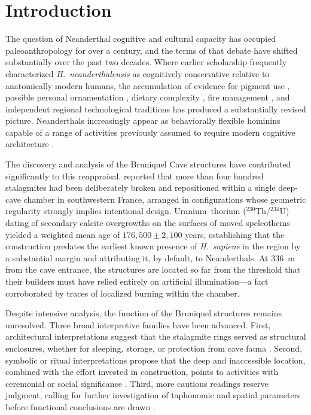 \documentclass[12pt]{article}
\begin{document}
\tableofcontents
\newpage

\section{Introduction}

The question of Neanderthal cognitive and cultural capacity has occupied paleoanthropology for over a century, and the terms of that debate have shifted substantially over the past two decades. Where earlier scholarship frequently characterized \textit{H.\ neanderthalensis} as cognitively conservative relative to anatomically modern humans, the accumulation of evidence for pigment use \citep{Zilhao2010, Roebroeks2012}, possible personal ornamentation \citep{Peresani2011, Radovčić2015, Morin2012}, dietary complexity \citep{Hardy2013}, fire management \citep{Sandgathe2011}, and independent regional technological traditions \citep{Wil2019} has produced a substantially revised picture. Neanderthals increasingly appear as behaviorally flexible hominins capable of a range of activities previously assumed to require modern cognitive architecture \citep{Stringer2012, Wil2019}.

The discovery and analysis of the Bruniquel Cave structures have contributed significantly to this reappraisal. \citet{Jaubert2016} reported that more than four hundred stalagmites had been deliberately broken and repositioned within a single deep-cave chamber in southwestern France, arranged in configurations whose geometric regularity strongly implies intentional design. Uranium--thorium ($^{230}$Th/$^{234}$U) dating of secondary calcite overgrowths on the surfaces of moved speleothems yielded a weighted mean age of $176{,}500 \pm 2{,}100$ years, establishing that the construction predates the earliest known presence of \textit{H.\ sapiens} in the region by a substantial margin and attributing it, by default, to Neanderthals. At 336~m from the cave entrance, the structures are located so far from the threshold that their builders must have relied entirely on artificial illumination—a fact corroborated by traces of localized burning within the chamber.

Despite intensive analysis, the function of the Bruniquel structures remains unresolved. Three broad interpretive families have been advanced. First, architectural interpretations suggest that the stalagmite rings served as structural enclosures, whether for sleeping, storage, or protection from cave fauna \citep{Jaubert2016}. Second, symbolic or ritual interpretations propose that the deep and inaccessible location, combined with the effort invested in construction, points to activities with ceremonial or social significance \citep{Hayden2012, Wil2019}. Third, more cautious readings reserve judgment, calling for further investigation of taphonomic and spatial parameters before functional conclusions are drawn \citep{Chase2021}.
\end{document}
